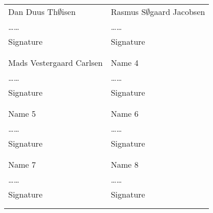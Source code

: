 \documentclass{article}
\begin{document}
\noindent
\begin{tabular}{p{70mm}p{70mm}}

%
%

Dan Duus Th$\emptyset$isen & Rasmus S$\emptyset$gaard Jacobsen \\
\dots\dotfill\dots & \dots\dotfill\dots \\
Signature & Signature \\
& \\
& \\

Mads Vestergaard Carlsen & Name 4 \\
\dots\dotfill\dots & \dots\dotfill\dots \\
Signature & Signature \\
& \\
& \\

Name 5 & Name 6 \\
\dots\dotfill\dots & \dots\dotfill\dots \\
Signature & Signature \\
& \\
& \\

Name 7 & Name 8 \\
\dots\dotfill\dots & \dots\dotfill\dots \\
Signature & Signature \\
& \\
& \\
\end{tabular}
\end{document}
